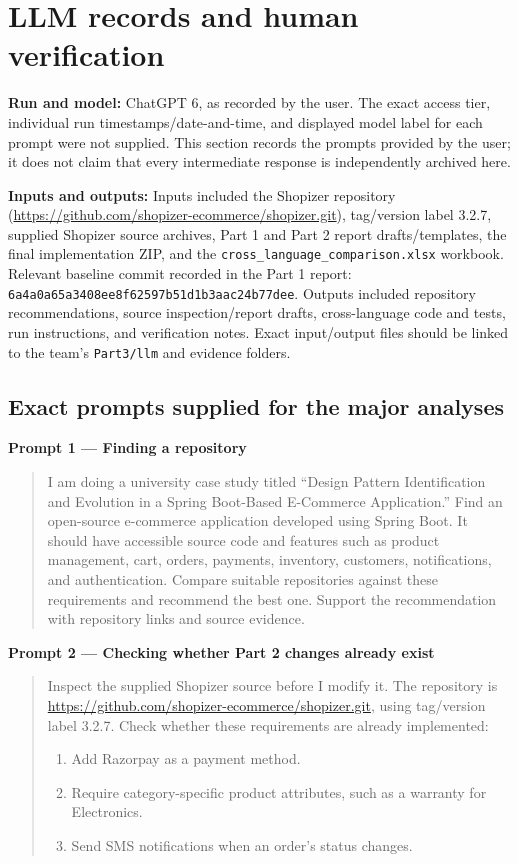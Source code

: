 \documentclass[11pt,a4paper]{article}
\begin{document}
\section{LLM records and human verification}

\textbf{Run and model:} ChatGPT 6, as recorded by the user. The exact access tier, individual run timestamps/date-and-time, and displayed model label for each prompt were not supplied. This section records the prompts provided by the user; it does not claim that every intermediate response is independently archived here.

\textbf{Inputs and outputs:} Inputs included the Shopizer repository (\url{https://github.com/shopizer-ecommerce/shopizer.git}), tag/version label 3.2.7, supplied Shopizer source archives, Part 1 and Part 2 report drafts/templates, the final implementation ZIP, and the \texttt{cross\_\allowbreak{}language\_\allowbreak{}comparison.\allowbreak{}xlsx} workbook. Relevant baseline commit recorded in the Part 1 report: \texttt{6a4a0a65a3408ee8f62597b51d1b3aac24b77dee}. Outputs included repository recommendations, source inspection/report drafts, cross-language code and tests, run instructions, and verification notes. Exact input/output files should be linked to the team's \texttt{Part3/llm} and evidence folders.

\subsection*{Exact prompts supplied for the major analyses}

\textbf{Prompt 1 --- Finding a repository}
\begin{quote}\small
I am doing a university case study titled ``Design Pattern Identification and Evolution in a Spring Boot-Based E-Commerce Application.'' Find an open-source e-commerce application developed using Spring Boot. It should have accessible source code and features such as product management, cart, orders, payments, inventory, customers, notifications, and authentication. Compare suitable repositories against these requirements and recommend the best one. Support the recommendation with repository links and source evidence.
\end{quote}

\textbf{Prompt 2 --- Checking whether Part 2 changes already exist}
\begin{quote}\small
Inspect the supplied Shopizer source before I modify it. The repository is \url{https://github.com/shopizer-ecommerce/shopizer.git}, using tag/version label 3.2.7. Check whether these requirements are already implemented:
\begin{enumerate}[nosep]
  \item Add Razorpay as a payment method.
  \item Require category-specific product attributes, such as a warranty for Electronics.
  \item Send SMS notifications when an order's status changes.
\end{enumerate}
\end{quote}
\end{document}
